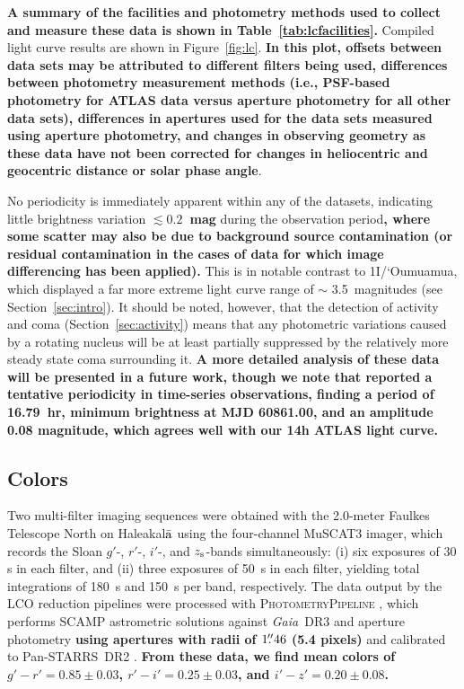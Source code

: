 \documentclass[linenumbers,twocolumn,longbib]{aastex7}
\begin{document}
\textbf{A summary of the facilities and photometry methods used to collect and measure these data is shown in Table~\ref{tab:lcfacilities}.} Compiled light curve results are shown in Figure~\ref{fig:lc}.  \textbf{In this plot, offsets between data sets may be attributed to different filters being used, differences between photometry measurement methods (i.e., PSF-based photometry for ATLAS data versus aperture photometry for all other data sets), differences in apertures used for the data sets measured using aperture photometry, and changes in observing geometry as these data have not been corrected for changes in heliocentric and geocentric distance or solar phase angle}.

No periodicity is immediately apparent within any of the datasets, indicating little brightness variation \textbf{$\lesssim0.2$~mag} during the observation period\textbf{, where some scatter may also be due to background source contamination (or residual contamination in the cases of data for which image differencing has been applied).}
This is in notable contrast to 1I/`Oumuamua, which displayed a far more extreme light curve range of $\sim$ 3.5~magnitudes (see Section~\ref{sec:intro}). It should be noted, however, that the detection of activity and coma (Section~\ref{sec:activity}) means that any photometric variations caused by a rotating nucleus will be at least partially suppressed by the relatively more steady state coma surrounding it.  \textbf{A more detailed analysis of these data will be presented in a future work, though we note that \citet{Marcos2025} reported a tentative periodicity in time-series observations, finding a period of 16.79~hr, minimum brightness at MJD 60861.00, and an amplitude 0.08 magnitude, which agrees  well with our 14h ATLAS light curve.}

\subsection{Colors}\label{sec:colors}

Two multi-filter imaging sequences were obtained with the 2.0-meter Faulkes Telescope North on Haleakal${\rm\bar{a}}$ using the four-channel MuSCAT3 imager, which records the Sloan $g'$-, $r'$-, $i'$-, and $z_{\rm s}$-bands simultaneously: (i) six exposures of 30 s in each filter, and (ii) three exposures of 50~s in each filter, yielding total integrations of 180~s and 150~s per band, respectively. The data output by the LCO reduction pipelines were processed with \textsc{PhotometryPipeline} \citep{Mommert_2017}, which performs SCAMP astrometric solutions against \textit{Gaia}~DR3 \citep{gaiacollaboration2023_gaiadr3} and aperture photometry \textbf{ using apertures with radii of $1\mbox{$.\!\!^{\prime\prime}$}46$ (5.4 pixels)} and calibrated to Pan-STARRS~DR2 \citep{flewelling2020_ps1}. \textbf{ From these data, we find mean colors of $g'-r'=0.85\pm0.03$, $r'-i'=0.25\pm0.03$, and $i'-z'=0.20\pm0.08$.}
\end{document}
